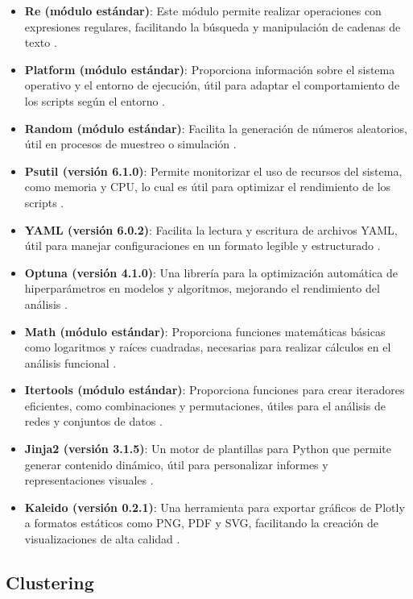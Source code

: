 \begin{itemize}
	\item \textbf{Re (módulo estándar)}: Este módulo permite realizar operaciones con expresiones regulares, facilitando la búsqueda y manipulación de cadenas de texto \cite{re}.
	\item \textbf{Platform (módulo estándar)}: Proporciona información sobre el sistema operativo y el entorno de ejecución, útil para adaptar el comportamiento de los scripts según el entorno \cite{platform}.
	\item \textbf{Random (módulo estándar)}: Facilita la generación de números aleatorios, útil en procesos de muestreo o simulación \cite{random}.
	\item \textbf{Psutil (versión 6.1.0)}: Permite monitorizar el uso de recursos del sistema, como memoria y CPU, lo cual es útil para optimizar el rendimiento de los scripts \cite{psutil}.
	\item \textbf{YAML (versión 6.0.2)}: Facilita la lectura y escritura de archivos YAML, útil para manejar configuraciones en un formato legible y estructurado \cite{pyyaml}.
	\item \textbf{Optuna (versión 4.1.0)}: Una librería para la optimización automática de hiperparámetros en modelos y algoritmos, mejorando el rendimiento del análisis \cite{optuna}.
	\item \textbf{Math (módulo estándar)}: Proporciona funciones matemáticas básicas como logaritmos y raíces cuadradas, necesarias para realizar cálculos en el análisis funcional \cite{math}.
	\item \textbf{Itertools (módulo estándar)}: Proporciona funciones para crear iteradores eficientes, como combinaciones y permutaciones, útiles para el análisis de redes y conjuntos de datos \cite{itertools}.
	\item \textbf{Jinja2 (versión 3.1.5)}: Un motor de plantillas para Python que permite generar contenido dinámico, útil para personalizar informes y representaciones visuales \cite{jinja2}.
	\item \textbf{Kaleido (versión 0.2.1)}: Una herramienta para exportar gráficos de Plotly a formatos estáticos como PNG, PDF y SVG, facilitando la creación de visualizaciones de alta calidad \cite{kaleido}.
	

\end{itemize}



\subsection{Clustering}

